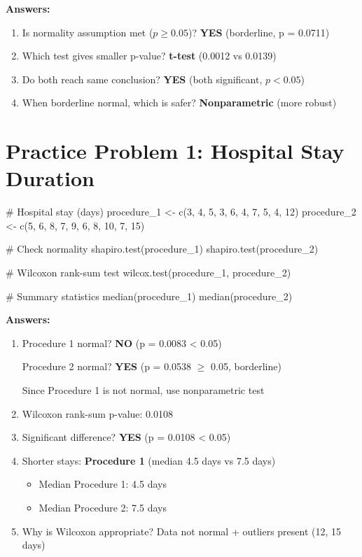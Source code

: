 \documentclass[11pt]{article}
\begin{document}
\textbf{Answers:}
\begin{enumerate}
\item \textcolor{answergreen}{Is normality assumption met ($p \geq 0.05$)? \textbf{YES} (borderline, p = 0.0711)}
\item \textcolor{answergreen}{Which test gives smaller p-value? \textbf{t-test} (0.0012 vs 0.0139)}
\item \textcolor{answergreen}{Do both reach same conclusion? \textbf{YES} (both significant, $p < 0.05$)}
\item \textcolor{answergreen}{When borderline normal, which is safer? \textbf{Nonparametric} (more robust)}
\end{enumerate}

\section{Practice Problem 1: Hospital Stay Duration}

\begin{rcode}
# Hospital stay (days)
procedure_1 <- c(3, 4, 5, 3, 6, 4, 7, 5, 4, 12)
procedure_2 <- c(5, 6, 8, 7, 9, 6, 8, 10, 7, 15)

# Check normality
shapiro.test(procedure_1)
shapiro.test(procedure_2)

# Wilcoxon rank-sum test
wilcox.test(procedure_1, procedure_2)

# Summary statistics
median(procedure_1)
median(procedure_2)
\end{rcode}

\textbf{Answers:}
\begin{enumerate}
\item \textcolor{answergreen}{Procedure 1 normal? \textbf{NO} (p = 0.0083 < 0.05)}

\textcolor{answergreen}{Procedure 2 normal? \textbf{YES} (p = 0.0538 $\geq$ 0.05, borderline)}

\textcolor{answergreen}{Since Procedure 1 is not normal, use nonparametric test}

\item \textcolor{answergreen}{Wilcoxon rank-sum p-value: 0.0108}

\item \textcolor{answergreen}{Significant difference? \textbf{YES} (p = 0.0108 < 0.05)}

\item \textcolor{answergreen}{Shorter stays: \textbf{Procedure 1} (median 4.5 days vs 7.5 days)}
\begin{itemize}
\item \textcolor{answergreen}{Median Procedure 1: 4.5 days}
\item \textcolor{answergreen}{Median Procedure 2: 7.5 days}
\end{itemize}

\item \textcolor{answergreen}{Why is Wilcoxon appropriate? Data not normal + outliers present (12, 15 days)}
\end{enumerate}
\end{document}
